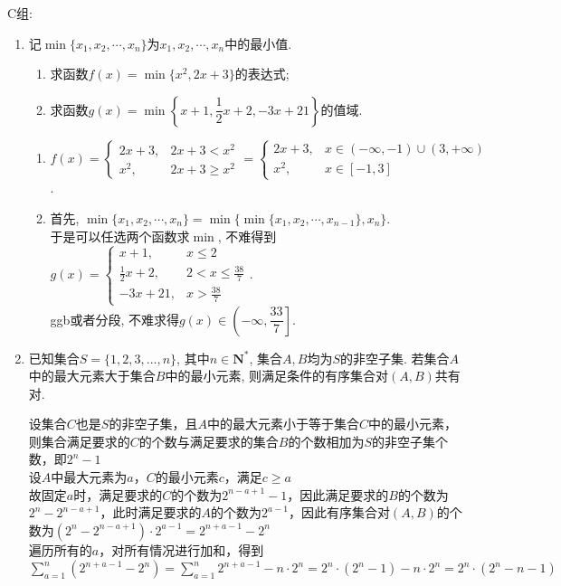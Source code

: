 C组: 
\begin{enumerate}

\item 记$\min\{x_1,x_2,\cdots,x_n\}$为$x_1,x_2,\cdots,x_n$中的最小值. 
\begin{enumerate}
\item 求函数$f(x)=\min\{x^2,2x+3\}$的表达式; 
\item 求函数$g(x)=\min\left\{x+1,\dfrac{1}{2}x+2,-3x+21\right\}$的值域. 
\end{enumerate}
\begin{jieda}
\begin{enumerate}[(1)]
\item $f(x)=\begin{cases}
2x+3, & 2x+3<x^2\\
x^2, & 2x+3\geq x^2
\end{cases}=\begin{cases}
2x+3, & x\in(-\infty,-1)\cup(3,+\infty)\\
x^2, & x\in[-1,3]
\end{cases}$. 

\item 首先, $\min\{x_1,x_2,\cdots,x_n\}=\min\{\min\{x_1,x_2,\cdots,x_{n-1}\},x_n\}$. \\
于是可以任选两个函数求$\min$, 不难得到$g(x)=\begin{cases}
x+1, & x\leq 2\\
\frac{1}{2}x+2, & 2<x\leq\frac{38}{7}\\
-3x+21, & x>\frac{38}{7}
\end{cases}$. \\
ggb或者分段, 不难求得$g(x)\in\left(-\infty,\dfrac{33}{7}\right]$. 
\end{enumerate}
\end{jieda}

\begin{vspace_}
\vsp[6]
\end{vspace_}

\item 已知集合$S = \{1,2,3, ..., n\}$, 其中$n \in \mathbf{N^*}$, 集合$A,B$均为$S$的非空子集. 若集合$A$中的最大元素大于集合$B$中的最小元素, 则满足条件的有序集合对$(A, B)$共有对. 

\begin{jieda}
设集合$C$也是$S$的非空子集，且$A$中的最大元素小于等于集合$C$中的最小元素，则集合满足要求的$C$的个数与满足要求的集合$B$的个数相加为$S$的非空子集个数，即$2^n - 1$ \\
设$A$中最大元素为$a$，$C$的最小元素$c$，满足$c \geq a$ \\
故固定$a$时，满足要求的$C$的个数为$2^{n-a+1}-1$，因此满足要求的$B$的个数为$2^n - 2^{n-a+1}$，此时满足要求的$A$的个数为$2^{a-1}$，因此有序集合对$(A, B)$的个数为$(2^n - 2^{n-a+1}) \cdot 2^{a-1} = 2^{n+a-1} -2^n$ \\
遍历所有的$a$，对所有情况进行加和，得到$\sum_{a=1}^n (2^{n+a-1} -2^n) = \sum_{a=1}^n 2^{n+a-1} - n \cdot 2^n = 2^n \cdot (2^n-1) - n \cdot 2^n = 2^n \cdot (2^n-n-1)$
\end{jieda} 
\end{enumerate}
\clearpage

